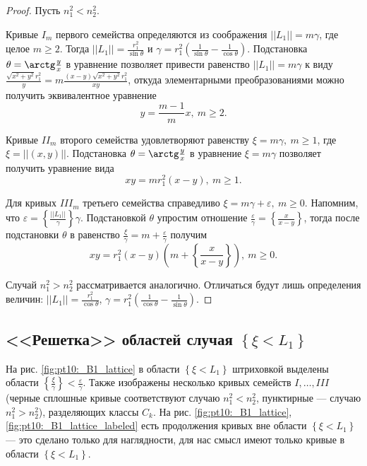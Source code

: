 \begin{proof}
Пусть $n_1^2 < n_2^2$.

Кривые $I_m$ первого семейства определяются из соображения $||L_1|| = m \gamma$, где целое $m \geq 2$. 
Тогда $||L_1|| = \frac{r_1^2}{\sin \theta}$ и $\gamma = r_1^2 \left( \frac{1}{\sin \theta} - \frac{1}{\cos \theta} \right)$.
Подстановка $\theta = \arctg \frac{y}{x}$ в уравнение позволяет привести равенство $||L_1|| = m \gamma$ к виду 
$ \frac{\sqrt{x^2 + y^2} r_1^2}{y} = m \frac{(x-y) \sqrt{x^2+y^2} r_1^2}{x y}$,
откуда элементарными преобразованиями можно получить эквивалентное уравнение 
$$y = \frac{m-1}{m} x, \ m \geq 2.$$

Кривые $II_m$ второго семейства удовлетворяют равенству $\xi = m \gamma, \ m \geq 1$, где $\xi = ||(x,y)||$.
Подстановка $\theta = \arctg \frac{y}{x}$ в уравнение $\xi = m \gamma$ позволяет получить уравнение вида 
$$x y = m r_1^2 (x-y), \ m\geq 1.$$ 

Для кривых $III_m$ третьего семейства справедливо $\xi = m \gamma + \varepsilon, \  m \geq 0$. 
Напомним, что $\varepsilon =  \left\{ \frac{||L_1||}{\gamma} \right\} \gamma$.
Подстановкой $\theta$ упростим отношение $\frac{\varepsilon}{\gamma}  = \left\{ \frac{x}{x-y} \right\}$, тогда после подстановки $\theta$  в равенство $\frac{\xi}{\gamma} = m + \frac{\varepsilon}{\gamma}$ получим
$$x y = r_1^2 (x-y) \left(  m + \left\{ \frac{x}{x-y} \right\} \right), \ m\geq 0.$$ 

Случай $n_1^2 > n_2^2$ рассматривается аналогично. Отличаться будут лишь определения величин:
$||L_1|| = \frac{r_1^2}{\cos \theta}$, $\gamma = r_1^2 \left( \frac{1}{\cos \theta} - \frac{1}{\sin \theta} \right)$. 
\end{proof}

\subsection{<<Решетка>> областей случая $\left\{\xi < L_1\right\}$}\label{sec:ch4/sec3/subsec5}
На рис. \ref{fig:pt10:_B1_lattice} в области $\left\{\xi < L_1\right\}$ штриховкой выделены области $\left\{ \frac{\xi}{\gamma} \right\} < \frac{\varepsilon}{\gamma}$. 
Также изображены несколько кривых семейств $I, \ldots, III$ (черные сплошные кривые соответствуют случаю $n_1^2 < n_2^2$, пунктирные --- случаю $n_1^2 > n_2^2$), разделяющих классы $C_k$. 
На рис. \ref{fig:pt10:_B1_lattice}, \ref{fig:pt10:_B1_lattice_labeled} есть продолжения кривых вне области $\left\{\xi < L_1\right\}$ --- это сделано только для наглядности, для нас смысл имеют только кривые в области $\left\{\xi < L_1\right\}$.

